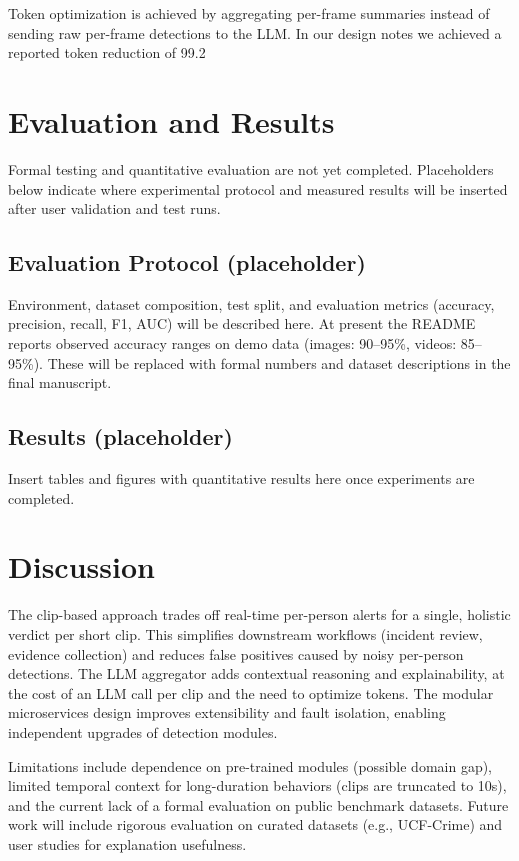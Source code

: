 \documentclass[conference]{IEEEtran}
\begin{document}
Token optimization is achieved by aggregating per-frame summaries instead of sending raw per-frame detections to the LLM. In our design notes we achieved a reported token reduction of 99.2%

\section{Evaluation and Results}
Formal testing and quantitative evaluation are not yet completed. Placeholders below indicate where experimental protocol and measured results will be inserted after user validation and test runs.

\subsection{Evaluation Protocol (placeholder)}
Environment, dataset composition, test split, and evaluation metrics (accuracy, precision, recall, F1, AUC) will be described here. At present the README reports observed accuracy ranges on demo data (images: 90--95\%, videos: 85--95\%). These will be replaced with formal numbers and dataset descriptions in the final manuscript.

\subsection{Results (placeholder)}
Insert tables and figures with quantitative results here once experiments are completed.

\section{Discussion}
The clip-based approach trades off real-time per-person alerts for a single, holistic verdict per short clip. This simplifies downstream workflows (incident review, evidence collection) and reduces false positives caused by noisy per-person detections. The LLM aggregator adds contextual reasoning and explainability, at the cost of an LLM call per clip and the need to optimize tokens. The modular microservices design improves extensibility and fault isolation, enabling independent upgrades of detection modules.

Limitations include dependence on pre-trained modules (possible domain gap), limited temporal context for long-duration behaviors (clips are truncated to 10s), and the current lack of a formal evaluation on public benchmark datasets. Future work will include rigorous evaluation on curated datasets (e.g., UCF-Crime) and user studies for explanation usefulness.
\end{document}
